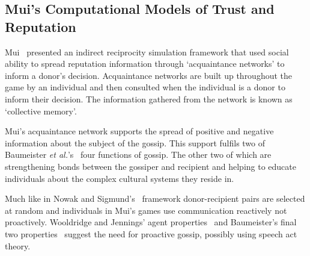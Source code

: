 \documentclass[]{final_report}
\begin{document}
\subsection{Mui's Computational Models of Trust and Reputation}
Mui~\cite{mui2002computational} presented an indirect reciprocity simulation framework that used social ability to spread reputation information through `acquaintance networks' to inform a donor's decision. Acquaintance networks are built up throughout the game by an individual and then consulted when the individual is a donor to inform their decision. The information gathered from the network is known as `collective memory'.\par
Mui's acquaintance network supports the spread of positive and negative information about the subject of the gossip. This support fulfils two of Baumeister \textit{et al.}'s~\cite{baumeister2004gossip} four functions of gossip. The other two of which are strengthening bonds between the gossiper and recipient and helping to educate individuals about the complex cultural systems they reside in.\par 
Much like in Nowak and Sigmund's~\cite{evol_indirect_image} framework donor-recipient pairs are selected at random and individuals in Mui's games use communication reactively not proactively. Wooldridge and Jennings' agent properties~\cite{wooldridge_jennings_1995} and Baumeister's final two properties~\cite{baumeister2004gossip} suggest the need for proactive gossip, possibly using speech act theory.
\end{document}
